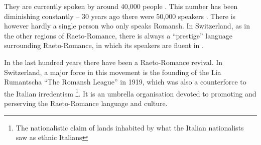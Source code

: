 They are currently spoken by around 40,000 people \autocite{bundesamt2020}. 
This number has been diminishing constantly -- 30 years ago there were 50,000 speakers \autocite{haiman1992}. 
There is however hardly a single person who only speaks Romansh. 
In Switzerland, as in the other regions of Raeto-Romance, there is always a \enquote{prestige} language surrounding Raeto-Romance, in which its speakers are fluent in \autocite[3]{haiman1992}. 

In the last hundred years there have been a Raeto-Romance revival. 
In Switzerland, a major force in this movement is the founding of the Lia Rumantscha \enquote{The Romansh League} in 1919, which was also a counterforce to the Italian irredentism \footnote{The nationalistic claim of lands inhabited by what the Italian nationalists saw as ethnic Italians}. 
It is an umbrella organisation devoted to promoting and perserving the Raeto-Romance language and culture. 

